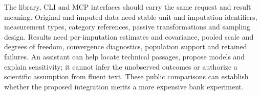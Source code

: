 The library, CLI and MCP interfaces should carry the same request and result
meaning. Original and imputed data need stable unit and imputation identifiers,
measurement types, category references, passive transformations and sampling
design. Results need per-imputation estimates and covariance, pooled scale and
degrees of freedom, convergence diagnostics, population support and retained
failures. An assistant can help locate technical passages, propose models and
explain sensitivity; it cannot infer the unobserved outcomes or authorize a
scientific assumption from fluent text. These public comparisons can establish
whether the proposed integration merits a more expensive bank experiment.
